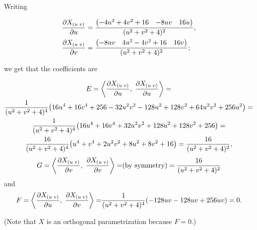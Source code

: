 \documentclass[
    12pt, %
]{fphw}
\newcommand{\inner}[2]{\left\langle #1, \; #2 \right\rangle}
\begin{document}
\newcommand{\dX}[1]{{\pdv{X_{(u \; v)}}{#1}}}

Writing

\begin{align*}
    \dX{u} &= \frac{\mqty(-4u^2 + 4v^2 + 16 & -8uv & 16u)}{(u^2+v^2+4)^2}, \\
    \dX{v} &= \frac{\mqty(-8uv & 4u^2 - 4v^2 + 16 & 16v)}{(u^2+v^2+4)^2};
\end{align*}

\noindent
we get that the coefficients are

\begin{multline*}
    {E = \inner{\dX{u}}{\dX{u}} = } \\
    \frac{1}{(u^2+v^2+4)^4}
        \qty(16u^4+16v^4+256-32u^2v^2-128u^2+128v^2 + 64u^2v^2 + 256u^2) = \\
    \frac{1}{(u^2+v^2+4)^4}
        \qty(16u^4+16v^4 +32u^2v^2 + 128u^2 + 128v^2 + 256) = \\
    \frac{16}{(u^2+v^2+4)^4}
        \qty(u^4+v^4 +2u^2v^2 + 8u^2 + 8v^2 + 16) =
    \frac{16}{(u^2+v^2+4)^2},
\end{multline*}
\begin{multline*}
    {G = \inner{\dX{v}}{\dX{v}} = }
    \hfill \text{(by symmetry)} \hfill =
    \frac{16}{(u^2+v^2+4)^2}
\end{multline*}
and
\begin{multline*}
    {F = \inner{\dX{u}}{\dX{v}} = }
    \hfill \frac{1}{(u^2+v^2+4)^4} \qty(-128uv - 128uv + 256uv) \hfill =
    0.
\end{multline*}

(Note that $X$ is an orthogonal parametrization because $F = 0$.)

\end{document}

